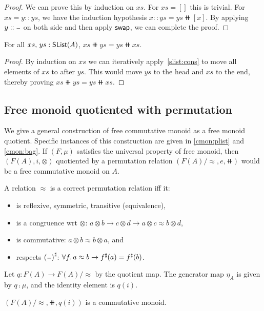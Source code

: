 \begin{proof}
We can prove this by induction on $xs$.
For $xs = []$ this is trivial. For $xs = y :: ys$, we have the induction hypothesis $x :: ys = ys \doubleplus [ x ]$.
By applying $y :: {\scriptstyle{-}}$ on both side and then apply $\operatorname{\mathsf{swap}}$, we can complete the proof.
\end{proof}

\begin{theorem}[Commutativity]\label{slist:comm}
    For all $xs,\,ys : \operatorname{\mathsf{SList}}(A)$, $xs \doubleplus ys = ys \doubleplus xs$.
\end{theorem}

\begin{proof}
    By induction on $xs$ we can iteratively apply~\ref{slist:cons} to move all elements of $xs$
    to after $ys$. This would move $ys$ to the head and $xs$ to the end, thereby proving
    $xs \doubleplus ys = ys \doubleplus xs$.
\end{proof}

\subsection{Free monoid quotiented with permutation}\label{cmon:qfreemon}
We give a general construction of free commutative monoid as a free monoid quotient.
Specific instances of this construction are given in \ref{cmon:plist} and \ref{cmon:bag}.
If $(F, \mu)$ satisfies the universal property of free monoid,
then $(F(A), i, \otimes)$ quotiented by a permutation relation $(F(A) / \approx, e, \doubleplus)$
would be a free commutative monoid on $A$.

A relation $\approx$ is a correct permutation relation iff it:
\begin{itemize}
    \item is reflexive, symmetric, transitive (equivalence),
    \item is a congruence wrt $\otimes$: $a \otimes b \to c \otimes d \to a \otimes c \approx b \otimes d$,
    \item is commutative: $a \otimes b \approx b \otimes a$, and
    \item respects ${({\scriptstyle{-}})}^{\sharp}$: $\forall f. \, a \approx b \to {f}^{\sharp}(a) = {f}^{\sharp}(b)$.
\end{itemize}

Let $q : F(A) \to F(A) / \approx$ by the quotient map.
The generator map $\eta_A$ is given by $q \comp \mu$, and the identity element is $q(i)$.

\begin{proposition}
$(F(A) / \approx, \doubleplus, q(i))$ is a commutative monoid.
\end{proposition}

